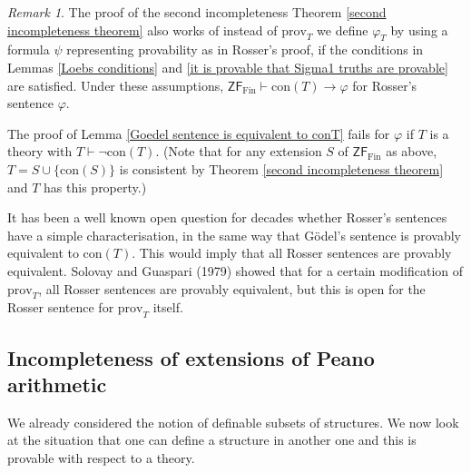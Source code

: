 \documentclass[a4paper, 11pt]{amsart}
\theoremstyle{remark}
\newtheorem{remark}[remark]{Remark}
\newcommand{\axiomft}[1]{\mathsf{#1}}
\newcommand{\ZF}{\axiomft{ZF}}
\newcommand{\Fin}{\mathrm{Fin}}
\newcommand{\prov}{\mathrm{prov}}
\begin{document}
\begin{remark} 
The proof of the second incompleteness Theorem \ref{second incompleteness theorem} also works of instead of $\prov_T$ we define $\varphi_T$ by using a formula $\psi$ representing provability as in Rosser's proof, if the conditions in Lemmas \ref{Loebs conditions} and \ref{it is provable that Sigma1 truths are provable} are satisfied. 
Under these assumptions, $\ZF_\Fin\vdash \mathrm{con}(T)\rightarrow \varphi$ for Rosser's sentence $\varphi$. 

The proof of Lemma \ref{Goedel sentence is equivalent to conT} fails for $\varphi$ if $T$ is a theory with $T\vdash \neg\mathrm{con}(T)$. 
(Note that for any extension $S$ of $\ZF_\Fin$ as above, $T=S\cup \{\mathrm{con}(S)\}$ is consistent by Theorem \ref{second incompleteness theorem} and $T$ has this property.) 

It has been a well known open question for decades whether Rosser's sentences have a simple characterisation, in the same way that G\"odel's sentence is provably equivalent to $\mathrm{con}(T)$. 
This would imply that all Rosser sentences are provably equivalent. 
Solovay and Guaspari (1979) showed that for a certain modification of $\prov_T$, all Rosser sentences are provably equivalent, but this is open for the Rosser sentence for $\prov_T$ itself. 
\end{remark} 





\subsection{Incompleteness of extensions of Peano arithmetic} 





We already considered the notion of definable subsets of structures. 
We now look at the situation that one can define a structure in another one and this is provable with respect to a theory. 
\end{document}

